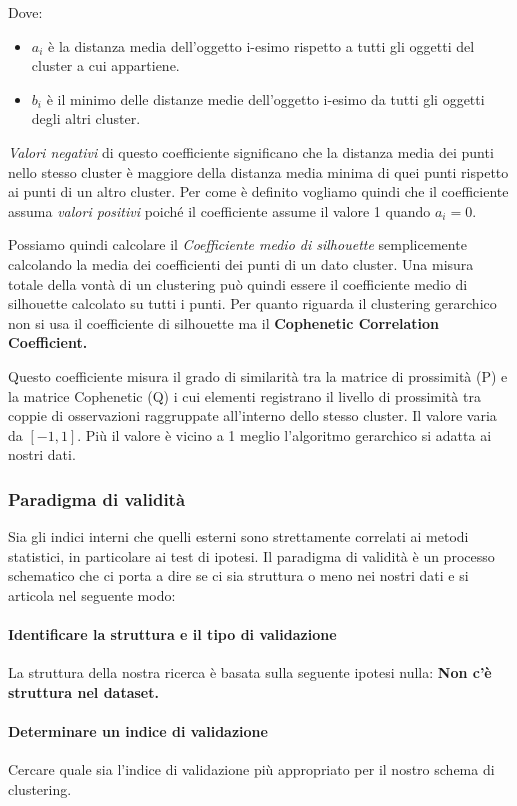 Dove:
\begin{itemize}
	\item $a_{i}$ è la distanza media dell'oggetto i-esimo rispetto a tutti gli oggetti del cluster a cui appartiene.
	\item $b_{i}$ è il minimo delle distanze medie dell'oggetto i-esimo da tutti gli oggetti degli altri cluster.
\end{itemize}

\textit{Valori negativi} di questo coefficiente significano che la distanza media dei punti nello stesso cluster è maggiore della distanza media minima di quei punti rispetto ai punti di un altro cluster.  Per come è definito vogliamo quindi che il coefficiente assuma \textit{valori positivi} poiché il coefficiente assume il valore 1 quando $a_i = 0$.

Possiamo quindi calcolare il \textit{Coefficiente medio di silhouette} semplicemente calcolando la media dei coefficienti dei punti di un dato cluster. Una misura totale della vontà di un clustering può quindi essere il coefficiente medio di silhouette calcolato su tutti i punti.
Per quanto riguarda il clustering gerarchico non si usa il coefficiente di silhouette ma il \textbf{Cophenetic Correlation Coefficient.}

Questo coefficiente misura il grado di similarità tra la matrice di prossimità (P) e la matrice Cophenetic (Q) i cui elementi registrano il livello di prossimità tra coppie di osservazioni raggruppate all'interno dello stesso cluster.
 Il valore varia da $[-1,1]$. Più il valore è vicino a 1 meglio l'algoritmo gerarchico si adatta ai nostri dati.
 \subsubsection{Paradigma di validità}

 Sia gli indici interni che quelli esterni sono strettamente correlati ai metodi statistici, in particolare ai test di ipotesi. Il paradigma di validità è un processo schematico che ci porta a dire se ci sia struttura o meno nei nostri dati e si articola nel seguente modo:
 
 \paragraph{Identificare la struttura e il tipo di validazione} La struttura della nostra ricerca è basata sulla seguente ipotesi nulla:
 \textbf{Non c'è struttura nel dataset.}
 \paragraph{Determinare un indice di validazione} Cercare quale sia l'indice di validazione più appropriato per il nostro schema di clustering.
